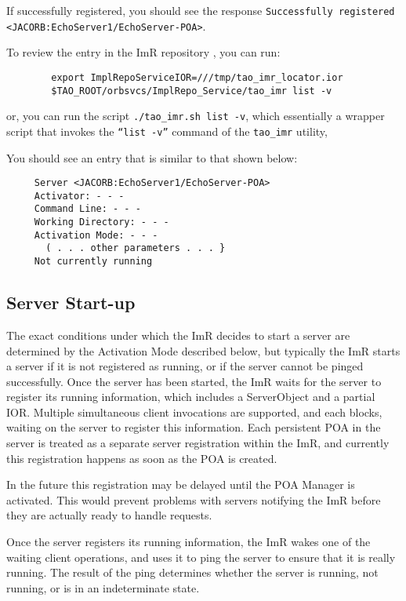 If successfully registered, you should see the response
{\tt Successfully registered <JACORB:EchoServer1/EchoServer-POA>}.

To review the entry in the ImR repository , you can run:

\begin{verbatim}
        export ImplRepoServiceIOR=///tmp/tao_imr_locator.ior
        $TAO_ROOT/orbsvcs/ImplRepo_Service/tao_imr list -v
\end{verbatim}

or, you can run the script {\tt ./tao\_imr.sh list -v}, which essentially
a wrapper script that invokes the {\tt “list -v”} command of the
{\tt tao\_imr} utility,

You should see an entry that is similar to that shown below:

\small{
\begin{verbatim}
     Server <JACORB:EchoServer1/EchoServer-POA>
     Activator: - - -
     Command Line: - - -
     Working Directory: - - -
     Activation Mode: - - -
       ( . . . other parameters . . . }
     Not currently running
\end{verbatim}
}

\subsection{Server Start-up}

The exact conditions under which the ImR decides to start a server are
determined by the Activation Mode described below, but typically the
ImR starts a server if it is not registered as running, or if the server cannot
be pinged successfully. Once the server has been started, the ImR waits
for the server to register its running information, which includes a
ServerObject and a partial IOR. Multiple simultaneous client invocations
are supported, and each blocks, waiting on the server to register this
information. Each persistent POA in the server is treated as a separate
server registration within the ImR, and currently this registration happens
as soon as the POA is created.

In the future this registration may be delayed until the POA Manager
is activated. This would prevent problems with servers notifying the ImR
before they are actually ready to handle requests.

Once the server registers its running information, the ImR wakes one of
the waiting client operations, and uses it to ping the server to ensure that
it is really running. The result of the ping determines whether the server
is running, not running, or is in an indeterminate state.

